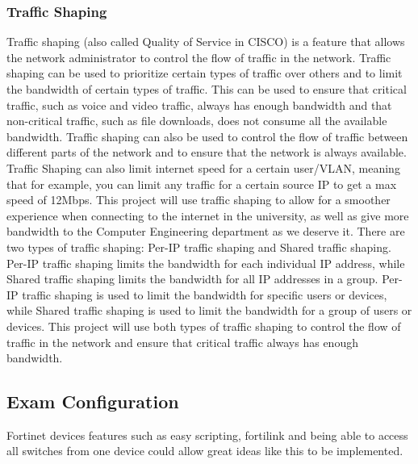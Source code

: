 \documentclass[12pt]{report}
\begin{document}
\subsubsection{Traffic Shaping}
Traffic shaping (also called Quality of Service in CISCO) is a feature that allows the network administrator to control the flow of traffic in the network. Traffic shaping can be used to prioritize certain types of traffic over others and to limit the bandwidth of certain types of traffic. This can be used to ensure that critical traffic, such as voice and video traffic, always has enough bandwidth and that non-critical traffic, such as file downloads, does not consume all the available bandwidth. Traffic shaping can also be used to control the flow of traffic between different parts of the network and to ensure that the network is always available. Traffic Shaping can also limit internet speed for a certain user/VLAN, meaning that for example, you can limit any traffic for a certain source IP to get a max speed of 12Mbps. This project will use traffic shaping to allow for a smoother experience when connecting to the internet in the university, as well as give more bandwidth to the Computer Engineering department as we deserve it.
There are two types of traffic shaping: Per-IP traffic shaping and Shared traffic shaping. Per-IP traffic shaping limits the bandwidth for each individual IP address, while Shared traffic shaping limits the bandwidth for all IP addresses in a group. Per-IP traffic shaping is used to limit the bandwidth for specific users or devices, while Shared traffic shaping is used to limit the bandwidth for a group of users or devices. This project will use both types of traffic shaping to control the flow of traffic in the network and ensure that critical traffic always has enough bandwidth. \cite{SharedTrafficShaping} \cite{PerIPTrafficShaping}
\subsection{Exam Configuration}
Fortinet devices features such as easy scripting, fortilink and being able to access all switches from one device could allow great ideas like this to be implemented.
\end{document}
